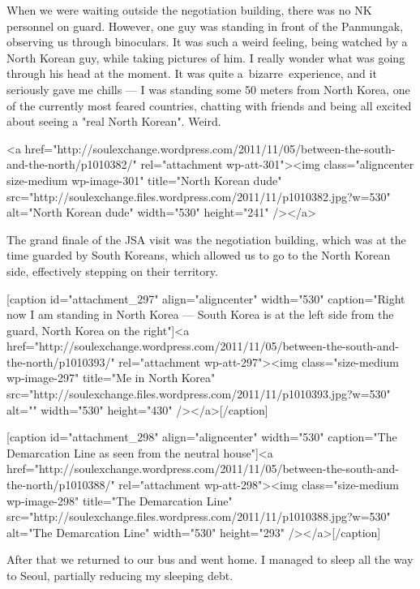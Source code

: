 \begin{post}
\begin{content}
When we were waiting outside the negotiation building, there was no NK personnel on guard. However, one guy was standing in front of the Panmungak, observing us through binoculars. It was such a weird feeling, being watched by a North Korean guy, while taking pictures of him. I really wonder what was going through his head at the moment. It was quite a bizarre experience, and it seriously gave me chills — I was standing some 50 meters from North Korea, one of the currently most feared countries, chatting with friends and being all excited about seeing a "real North Korean". Weird.



<a href="http://soulexchange.wordpress.com/2011/11/05/between-the-south-and-the-north/p1010382/" rel="attachment wp-att-301"><img class="aligncenter size-medium wp-image-301" title="North Korean dude" src="http://soulexchange.files.wordpress.com/2011/11/p1010382.jpg?w=530" alt="North Korean dude" width="530" height="241" /></a>



The grand finale of the JSA visit was the negotiation building, which was at the time guarded by South Koreans, which allowed us to go to the North Korean side, effectively stepping on their territory.



[caption id="attachment_297" align="aligncenter" width="530" caption="Right now I am standing in North Korea — South Korea is at the left side from the guard, North Korea on the right"]<a href="http://soulexchange.wordpress.com/2011/11/05/between-the-south-and-the-north/p1010393/" rel="attachment wp-att-297"><img class="size-medium wp-image-297" title="Me in North Korea" src="http://soulexchange.files.wordpress.com/2011/11/p1010393.jpg?w=530" alt="" width="530" height="430" /></a>[/caption]



[caption id="attachment_298" align="aligncenter" width="530" caption="The Demarcation Line as seen from the neutral house"]<a href="http://soulexchange.wordpress.com/2011/11/05/between-the-south-and-the-north/p1010388/" rel="attachment wp-att-298"><img class="size-medium wp-image-298" title="The Demarcation Line" src="http://soulexchange.files.wordpress.com/2011/11/p1010388.jpg?w=530" alt="The Demarcation Line" width="530" height="293" /></a>[/caption]



After that we returned to our bus and went home. I managed to sleep all the way to Seoul, partially reducing my sleeping debt.




\end{content}
\end{post}
